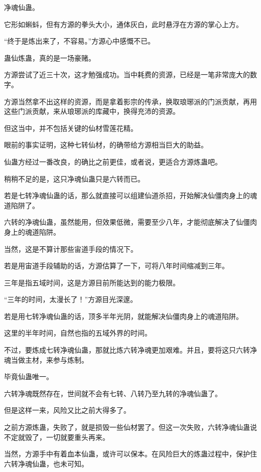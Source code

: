 
\begin{this_body}

净魂仙蛊。

它形如蝌蚪，但有方源的拳头大小，通体灰白，此时悬浮在方源的掌心上方。

“终于是炼出来了，不容易。”方源心中感慨不已。

蛊仙炼蛊，真的是一场豪赌。

方源尝试了近三十次，这才勉强成功。当中耗费的资源，已经是一笔非常庞大的数字。

方源当然拿不出这样的资源，而是拿着影宗的传承，换取琅琊派的门派贡献，再用这些门派贡献，来从琅琊派的库藏中，换得充沛的资源。

但这当中，并不包括关键的仙材雪莲花精。

眼前的事实证明，这种七转仙材，的确带给方源相当巨大的助益。

仙蛊方经过一番改良，的确比之前更佳，或者说，更适合方源炼蛊吧。

稍稍不足的是，这只净魂仙蛊只是六转而已。

若是七转净魂仙蛊的话，那么就直接可以组建仙道杀招，开始解决仙僵肉身上的魂道陷阱了。

六转的净魂仙蛊，虽然能用，但效果低微，需要至少八年，才能彻底解决了仙僵肉身上的魂道陷阱。

当然，这是不算计那些宙道手段的情况下。

若是用宙道手段辅助的话，方源估算了一下，可将八年时间缩减到三年。

三年是指五域时间，这是方源目前所能达到的能力极限。

“三年的时间，太漫长了！”方源目光深邃。

若是用七转净魂仙蛊的话，顶多半年光阴，就能解决仙僵肉身上的魂道陷阱。

这里的半年时间，自然也指的五域外界的时间。

不过，要炼成七转净魂仙蛊，那就比炼六转净魂更加艰难。并且，要将这只六转净魂当做主材，来参与炼制。

毕竟仙蛊唯一。

六转净魂既然存在，世间就不会有七转、八转乃至九转的净魂仙蛊了。

但是这样一来，风险又比之前大得多了。

之前方源炼蛊，失败了，就是损毁一些仙材罢了。但这一次失败，六转净魂仙蛊说不定就毁了，一切就要重头再来。

当然，方源手中有着血本仙蛊，或许可以保本。在风险巨大的炼蛊过程中，保护住六转净魂仙蛊，也未可知。


\end{this_body}
